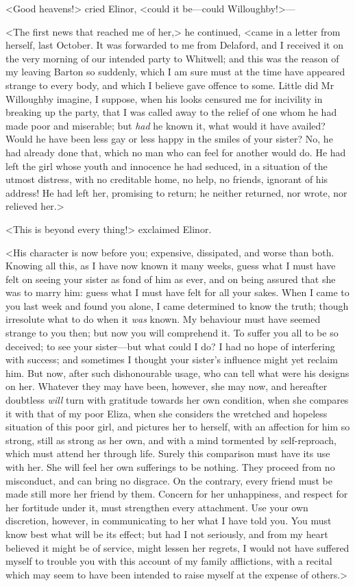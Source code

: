 <Good heavens!> cried Elinor, <could it be—could Willoughby!>—

<The first news that reached me of her,> he continued, <came in a letter from herself, last October. It was forwarded to me from Delaford, and I received it on the very morning of our intended party to Whitwell; and this was the reason of my leaving Barton so suddenly, which I am sure must at the time have appeared strange to every body, and which I believe gave offence to some. Little did Mr Willoughby imagine, I suppose, when his looks censured me for incivility in breaking up the party, that I was called away to the relief of one whom he had made poor and miserable; but \textit{had} he known it, what would it have availed? Would he have been less gay or less happy in the smiles of your sister? No, he had already done that, which no man who can feel for another would do. He had left the girl whose youth and innocence he had seduced, in a situation of the utmost distress, with no creditable home, no help, no friends, ignorant of his address! He had left her, promising to return; he neither returned, nor wrote, nor relieved her.>

<This is beyond every thing!> exclaimed Elinor.

<His character is now before you; expensive, dissipated, and worse than both. Knowing all this, as I have now known it many weeks, guess what I must have felt on seeing your sister as fond of him as ever, and on being assured that she was to marry him: guess what I must have felt for all your sakes. When I came to you last week and found you alone, I came determined to know the truth; though irresolute what to do when it \textit{was} known. My behaviour must have seemed strange to you then; but now you will comprehend it. To suffer you all to be so deceived; to see your sister—but what could I do? I had no hope of interfering with success; and sometimes I thought your sister's influence might yet reclaim him. But now, after such dishonourable usage, who can tell what were his designs on her. Whatever they may have been, however, she may now, and hereafter doubtless \textit{will} turn with gratitude towards her own condition, when she compares it with that of my poor Eliza, when she considers the wretched and hopeless situation of this poor girl, and pictures her to herself, with an affection for him so strong, still as strong as her own, and with a mind tormented by self-reproach, which must attend her through life. Surely this comparison must have its use with her. She will feel her own sufferings to be nothing. They proceed from no misconduct, and can bring no disgrace. On the contrary, every friend must be made still more her friend by them. Concern for her unhappiness, and respect for her fortitude under it, must strengthen every attachment. Use your own discretion, however, in communicating to her what I have told you. You must know best what will be its effect; but had I not seriously, and from my heart believed it might be of service, might lessen her regrets, I would not have suffered myself to trouble you with this account of my family afflictions, with a recital which may seem to have been intended to raise myself at the expense of others.>

